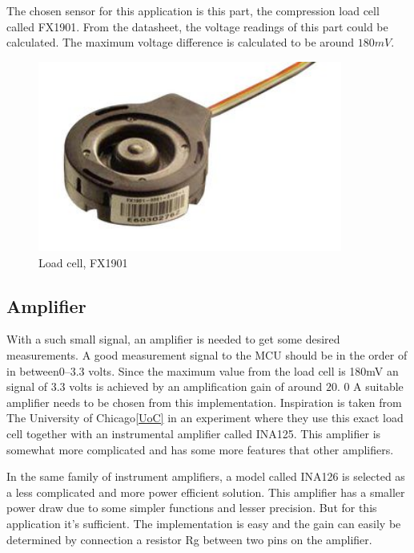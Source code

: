 The chosen sensor for this application is this part, the compression load cell called FX1901\cite{load cell}.  
From the datasheet, the voltage readings of this part could be calculated. The maximum voltage difference is calculated to be around $180mV$. 

\begin{figure}[H]%
\begin{center}
	\includegraphics[width = 10cm]{Figures/Load_cell.png}
	\caption{Load cell, FX1901}
	\label{Load_cell}
\end{center}
\end{figure}


\subsection{Amplifier}
With a such small signal, an amplifier is needed to get some desired measurements. A good measurement signal to the MCU should be in the order of in between$0–3.3$ volts. Since the maximum value from the load cell is 180mV an signal of 3.3 volts is achieved by an amplification gain of around $20$.  
0
A suitable amplifier needs to be chosen from this implementation. Inspiration is taken from The University of Chicago\ref{UoC} in an experiment where they use this exact load cell together with an instrumental amplifier called INA125. This amplifier is somewhat more complicated and has some more features that other amplifiers.  

In the same family of instrument amplifiers, a model called INA126 is selected as a less complicated and more power efficient solution.  
This amplifier has a smaller power draw due to some simpler functions and lesser precision. But for this application it's sufficient.  
The implementation is easy and the gain can easily be determined by connection a resistor Rg between two pins on the amplifier. 

